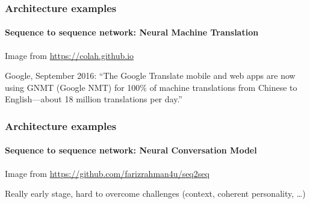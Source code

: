 \documentclass[9pt]{beamer}
\begin{document}
\begin{frame}
  \frametitle{Architecture examples}

  \framesubtitle{Sequence to sequence network: Neural Machine Translation}

  \begin{center}
  \end{center}

  {\small Image from \url{https://colah.github.io}}

  \bigskip

  Google, September 2016: ``The Google Translate mobile and web apps
  are now using GNMT (Google NMT) for 100\% of machine translations
  from Chinese to English—about 18 million translations per day.''

\end{frame}

\begin{frame}
  \frametitle{Architecture examples}

  \framesubtitle{Sequence to sequence network: Neural Conversation Model}

  \begin{center}
  \end{center}

  {\small Image from \url{https://github.com/farizrahman4u/seq2seq}}

  \bigskip

  Really early stage, hard to overcome challenges (context, coherent
  personality, \dots)
\end{frame}
\end{document}
